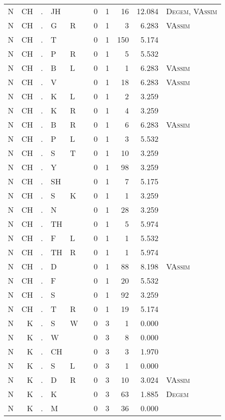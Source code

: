 \begin{longtable}{r@{ } r@{ } c@{ } l@{ } l@{ } l@{ } r r r r l }
N & CH & . & JH &  &  & 0 & 1 & 16 & 12.084 & \textsc{Degem}, \textsc{VAssim} \\
N & CH & . & G & R &  & 0 & 1 & 3 & 6.283 & \textsc{VAssim} \\
N & CH & . & T &  &  & 0 & 1 & 150 & 5.174 &  \\
N & CH & . & P & R &  & 0 & 1 & 5 & 5.532 &  \\
N & CH & . & B & L &  & 0 & 1 & 1 & 6.283 & \textsc{VAssim} \\
N & CH & . & V &  &  & 0 & 1 & 18 & 6.283 & \textsc{VAssim} \\
N & CH & . & K & L &  & 0 & 1 & 2 & 3.259 &  \\
N & CH & . & K & R &  & 0 & 1 & 4 & 3.259 &  \\
N & CH & . & B & R &  & 0 & 1 & 6 & 6.283 & \textsc{VAssim} \\
N & CH & . & P & L &  & 0 & 1 & 3 & 5.532 &  \\
N & CH & . & S & T &  & 0 & 1 & 10 & 3.259 &  \\
N & CH & . & Y &  &  & 0 & 1 & 98 & 3.259 &  \\
N & CH & . & SH &  &  & 0 & 1 & 7 & 5.175 &  \\
N & CH & . & S & K &  & 0 & 1 & 1 & 3.259 &  \\
N & CH & . & N &  &  & 0 & 1 & 28 & 3.259 &  \\
N & CH & . & TH &  &  & 0 & 1 & 5 & 5.974 &  \\
N & CH & . & F & L &  & 0 & 1 & 1 & 5.532 &  \\
N & CH & . & TH & R &  & 0 & 1 & 1 & 5.974 &  \\
N & CH & . & D &  &  & 0 & 1 & 88 & 8.198 & \textsc{VAssim} \\
N & CH & . & F &  &  & 0 & 1 & 20 & 5.532 &  \\
N & CH & . & S &  &  & 0 & 1 & 92 & 3.259 &  \\
N & CH & . & T & R &  & 0 & 1 & 19 & 5.174 &  \\
N & K & . & S & W &  & 0 & 3 & 1 & 0.000 &  \\
N & K & . & W &  &  & 0 & 3 & 8 & 0.000 &  \\
N & K & . & CH &  &  & 0 & 3 & 3 & 1.970 &  \\
N & K & . & S & L &  & 0 & 3 & 1 & 0.000 &  \\
N & K & . & D & R &  & 0 & 3 & 10 & 3.024 & \textsc{VAssim} \\
N & K & . & K &  &  & 0 & 3 & 63 & 1.885 & \textsc{Degem} \\
N & K & . & M &  &  & 0 & 3 & 36 & 0.000 &  \\

\end{longtable}
